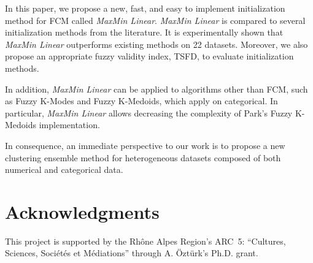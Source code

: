 \documentclass[runningheads,a4paper]{llncs}
\begin{document}
In this paper, we propose a new, fast, and easy to implement initialization method for FCM called \textit{MaxMin Linear}. \textit{MaxMin Linear} is compared to several initialization methods from the literature. It is experimentally shown that \textit{MaxMin Linear} outperforms existing methods on 22 datasets. Moreover, we also propose an appropriate fuzzy validity index, TSFD, to evaluate initialization methods.

In addition, \textit{MaxMin Linear} can be applied to algorithms other than FCM, such as Fuzzy K-Modes and Fuzzy K-Medoids, which apply on categorical. In particular, \textit{MaxMin Linear} allows decreasing the complexity of Park's Fuzzy K-Medoids implementation. 

In consequence, an immediate perspective to our work is to propose a new clustering ensemble method for heterogeneous datasets composed of both numerical and categorical data. 

\section*{Acknowledgments} This project is supported by the Rh\^{o}ne Alpes Region's ARC~5: ``Cultures, Sciences, Soci\'et\'es et M\'ediations'' through A. \"Ozt\"urk's Ph.D. grant.



\end{document}
